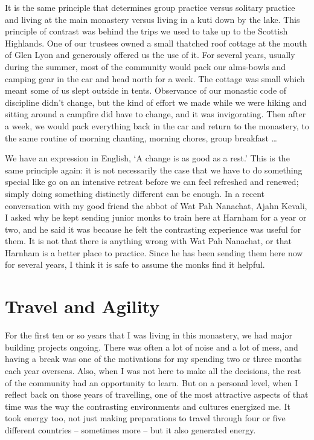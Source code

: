 It is the same principle that determines group practice versus solitary
practice and living at the main monastery versus living in a kuti down
by the lake. This principle of contrast was behind the trips we used to
take up to the Scottish Highlands. One of our trustees owned a small
thatched roof cottage at the mouth of Glen Lyon and generously offered
us the use of it. For several years, usually during the summer, most of
the community would pack our alms-bowls and camping gear in the car and
head north for a week. The cottage was small which meant some of us
slept outside in tents. Observance of our monastic code of discipline
didn't change, but the kind of effort we made while we were hiking and
sitting around a campfire did have to change, and it was invigorating.
Then after a week, we would pack everything back in the car and return
to the monastery, to the same routine of morning chanting, morning
chores, group breakfast \ldots{}

We have an expression in English, `A change is as good as a rest.' This
is the same principle again: it is not necessarily the case that we have
to do something special like go on an intensive retreat before we can
feel refreshed and renewed; simply doing something distinctly different
can be enough. In a recent conversation with my good friend the abbot of
Wat Pah Nanachat, Ajahn Kevali, I asked why he kept sending junior monks
to train here at Harnham for a year or two, and he said it was because
he felt the contrasting experience was useful for them. It is not that
there is anything wrong with Wat Pah Nanachat, or that Harnham is a
better place to practice. Since he has been sending them here now for
several years, I think it is safe to assume the monks find it helpful.

\section{Travel and Agility}

For the first ten or so years that I was living in this monastery, we
had major building projects ongoing. There was often a lot of noise and
a lot of mess, and having a break was one of the motivations for my
spending two or three months each year overseas. Also, when I was not
here to make all the decisions, the rest of the community had an
opportunity to learn. But on a personal level, when I reflect back on
those years of travelling, one of the most attractive aspects of that
time was the way the contrasting environments and cultures energized me.
It took energy too, not just making preparations to travel through four
or five different countries -- sometimes more -- but it also generated
energy.

